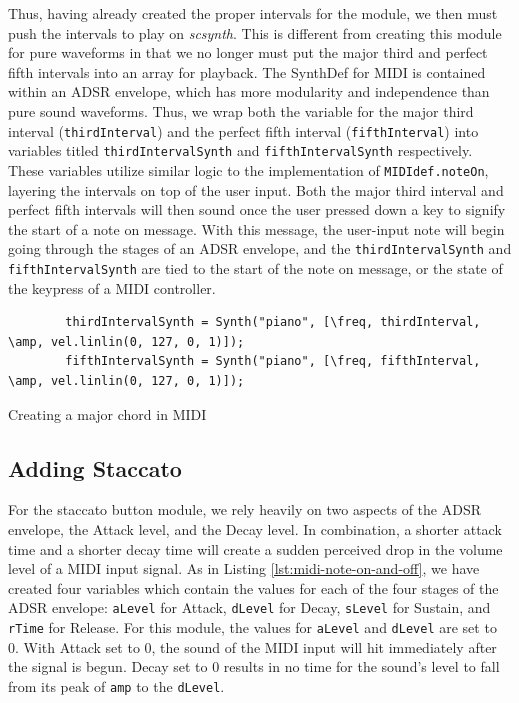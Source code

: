 Thus, having already created the proper intervals for the module, we then must push the intervals to play on \textit{scsynth}. This is different from creating this module for pure waveforms in that we no longer must put the major third and perfect fifth intervals into an array for playback. The SynthDef for MIDI is contained within an ADSR envelope, which has more modularity and independence than pure sound waveforms. Thus, we wrap both the variable for the major third interval (\texttt{thirdInterval}) and the perfect fifth interval (\texttt{fifthInterval}) into variables titled \texttt{thirdIntervalSynth} and \texttt{fifthIntervalSynth} respectively. These variables utilize similar logic to the implementation of \texttt{MIDIdef.noteOn}, layering the intervals on top of the user input. Both the major third interval and perfect fifth intervals will then sound once the user pressed down a key to signify the start of a note on message. With this message, the user-input note will begin going through the stages of an ADSR envelope, and the \texttt{thirdIntervalSynth} and \texttt{fifthIntervalSynth} are tied to the start of the note on message, or the state of the keypress of a MIDI controller.


\begin{listing}
	\begin{lstlisting}
		thirdIntervalSynth = Synth("piano", [\freq, thirdInterval, \amp, vel.linlin(0, 127, 0, 1)]);
		fifthIntervalSynth = Synth("piano", [\freq, fifthInterval, \amp, vel.linlin(0, 127, 0, 1)]);
	\end{lstlisting}
	\label{lst:midi-maj-chord}
	\caption{Creating a major chord in MIDI}
\end{listing}

\subsection{Adding Staccato}

For the staccato button module, we rely heavily on two aspects of the ADSR envelope, the Attack level, and the Decay level. In combination, a shorter attack time and a shorter decay time will create a sudden perceived drop in the volume level of a MIDI input signal. As in Listing \ref{lst:midi-note-on-and-off}, we have created four variables which contain the values for each of the four stages of the ADSR envelope: \texttt{aLevel} for Attack, \texttt{dLevel} for Decay, \texttt{sLevel} for Sustain, and \texttt{rTime} for Release. For this module, the values for \texttt{aLevel} and \texttt{dLevel} are set to 0. With Attack set to 0, the sound of the MIDI input will hit immediately after the signal is begun. Decay set to 0 results in no time for the sound's level to fall from its peak of \texttt{amp} to the \texttt{dLevel}.

